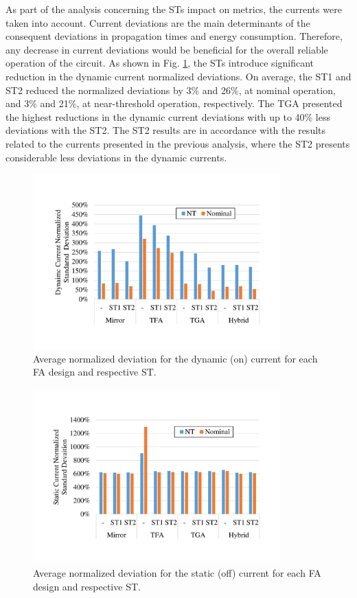 \documentclass[diss,pgmicro,english]{iiufrgs}
\begin{document}
As part of the analysis concerning the STs impact on metrics, the currents were taken into account. Current deviations are the main determinants of the consequent deviations in propagation times and energy consumption. Therefore, any decrease in current deviations would be beneficial for the overall reliable operation of the circuit. As shown in Fig. \ref{fig:onCurrDevFA}, the STs introduce significant reduction in the dynamic current normalized deviations. On average, the ST1 and ST2 reduced the normalized deviations by 3\% and 26\%, at nominal operation, and 3\% and 21\%, at near-threshold operation, respectively. The TGA presented the highest reductions in the dynamic current deviations with up to 40\% less deviations with the ST2. The ST2 results are in accordance with the results related to the currents presented in the previous analysis, where the ST2 presents considerable less deviations in the dynamic currents.

\begin{figure}[t]
  \centering
    \includegraphics[width=0.85\textwidth, trim={2cm 3cm 2cm 3cm}, clip]{onCurrDev.pdf}
     \caption{Average normalized deviation for the dynamic (on) current for each FA design and respective ST.}
  \label{fig:onCurrDevFA}
\end{figure}

\begin{figure}[h]
  \centering
    \includegraphics[width=0.85\textwidth, trim={2cm 3cm 2cm 3cm}, clip]{offCurrDev.pdf}
     \caption{Average normalized deviation for the static (off) current for each FA design and respective ST.}
  \label{fig:offCurrDevFA}
\end{figure}
\end{document}
